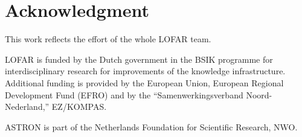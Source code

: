 \documentclass[journal]{IEEEtran}
\begin{document}

\section{}


\section*{Acknowledgment}


This work reflects the effort of the whole LOFAR team.

LOFAR is funded by the Dutch government in the BSIK programme for
interdisciplinary research for improvements of the knowledge infrastructure.
Additional funding is provided by the European Union, European Regional
Development Fund (EFRO) and by the ``Samenwerkingsverband Noord-Nederland,''
EZ/KOMPAS.

ASTRON is part of the Netherlands Foundation for Scientific Research, NWO.

\ifCLASSOPTIONcaptionsoff
  \newpage
\fi





%
%
%
%
%


\end{document}
